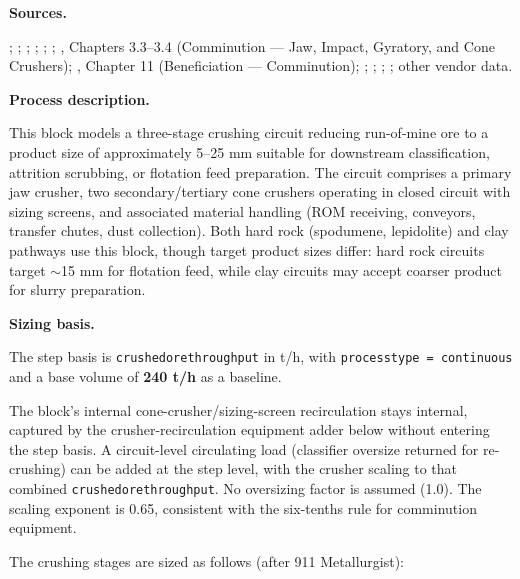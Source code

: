 \documentclass{article}
\renewcommand\_{\textunderscore\allowbreak}
\begin{document}
\medskip
\noindent\textbf{Sources.}\quad

\citet{gaoLithiumExtractionHard2023}; \citet{khakmardanLifeCycleAssessment2024}; \citet{liuCarbonFootprintBatteryGrade2025}; \citet{sgscanadaincSK1300Technical2024}; \citet{samariMineralResourceEstimate2024}; \citet{riordanTonopahLithiumClaims2023}; \citet{darlingSMEMiningEngineering2011}, Chapters 3.3--3.4 (Comminution --- Jaw, Impact, Gyratory, and Cone Crushers); \citet{ausimmMonograph27Cost}, Chapter 11 (Beneficiation --- Comminution); \citet{metso:outotecBasicsMineralsProcessing2024}; \citet{michaudCrushingMineralProcessing2015}; \citet{sandvikSandvikCH890iCH895i2019}; \citet{2025JawCrusher2025}; other vendor data.

\medskip
\noindent\textbf{Process description.}\quad

This block models a three-stage crushing circuit reducing run-of-mine ore to a product size of approximately 5--25 mm suitable for downstream classification, attrition scrubbing, or flotation feed preparation. The circuit comprises a primary jaw crusher, two secondary/tertiary cone crushers operating in closed circuit with sizing screens, and associated material handling (ROM receiving, conveyors, transfer chutes, dust collection). Both hard rock (spodumene, lepidolite) and clay pathways use this block, though target product sizes differ: hard rock circuits target $\sim$15 mm for flotation feed, while clay circuits may accept coarser product for slurry preparation.

\medskip
\noindent\textbf{Sizing basis.}\quad

The step basis is \texttt{crushed\_ore\_throughput} in t/h, with \texttt{process\_type = continuous} and a base volume of \textbf{240 t/h} as a baseline.

The block's internal cone-crusher/sizing-screen recirculation stays internal, captured by the crusher-recirculation equipment adder below without entering the step basis. A circuit-level circulating load (classifier oversize returned for re-crushing) can be added at the step level, with the crusher scaling to that combined \texttt{crushed\_ore\_throughput}. No oversizing factor is assumed (1.0). The scaling exponent is 0.65, consistent with the six-tenths rule for comminution equipment.

The crushing stages are sized as follows (after 911 Metallurgist):
\end{document}

